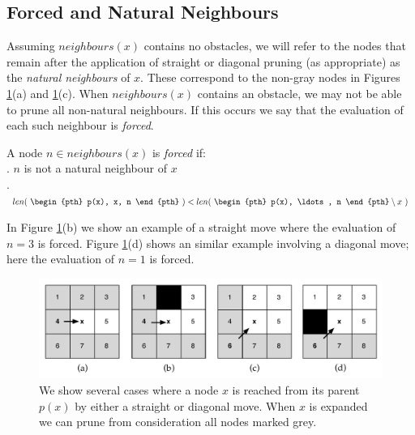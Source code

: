 \par \noindent
\subsection{Forced and Natural Neighbours}
Assuming $neighbours(x)$ contains no obstacles, we will refer to the nodes
that remain after the application of straight or diagonal pruning (as
appropriate) as the \emph{natural neighbours} of $x$. These correspond to the non-gray
nodes in Figures \ref{fig::jps::pruning}(a) and \ref{fig::jps::pruning}(c).
When $neighbours(x)$ contains an obstacle, we may not be able to prune
all non-natural neighbours. If this occurs we say that the evaluation of each
such neighbour is \emph{forced}.

\begin{definition}
\label{def::jps::forced}
A node $n \in neighbours(x)$ is \emph{forced} if: \\
. $n$ is not a natural neighbour of $x$\\
. $ len(~\begin{pth} p(x), x, n \end{pth}~) < len(~ \begin{pth} p(x), \ldots, n \end{pth} \setminus x~)$
\end{definition}
\par \noindent
In Figure \ref{fig::jps::pruning}(b) we show an example of a straight move where 
the evaluation of $n = 3$ is forced. Figure \ref{fig::jps::pruning}(d)  
shows an similar example involving a diagonal move; here the evaluation of
$n = 1$ is forced.

\begin{figure}[tb]
       \begin{center}
		   \includegraphics[width=0.95\columnwidth, trim = 10mm 10mm 10mm 0mm]
			{chapter_jps/diagrams/pruningrules.pdf}
       \end{center}
	\vspace{-3pt}
       \caption{We show several cases where a node $x$ is reached from its
parent $p(x)$ by either a straight or diagonal move. When $x$ is expanded we can
prune from consideration all nodes marked grey.}
       \label{fig::jps::pruning}
\end{figure}


